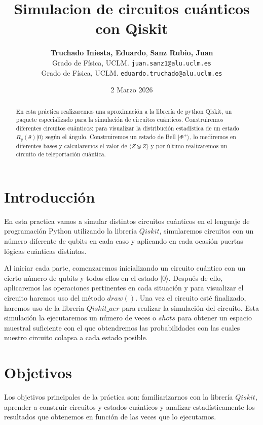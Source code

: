 \documentclass[11pt, a4paper, twocolumn]{article}
\title{\textbf{\Large Simulacion de circuitos cuánticos con Qiskit}}
\author{
	\textbf{Truchado Iniesta, Eduardo}, \textbf{Sanz Rubio, Juan} \\
	\small Grado de Física, UCLM. \texttt{juan.sanz1@alu.uclm.es} \\
	\small Grado de Física, UCLM. \texttt{eduardo.truchado@alu.uclm.es}
}
\date{\small 2 Marzo 2026}
\begin{document}
\maketitle
\thispagestyle{fancy}


\begin{abstract}
En esta práctica realizaremos una aproximación a la librería de python Qiskit,
un paquete especializado para la simulación de circuitos cuánticos. Construiremos
diferentes circuitos cuánticos: para visualizar la distribución estadística de 
un estado $R_y(\theta)|0\rangle$ según el ángulo. Construiremos un estado de Bell
$|\Phi^+\rangle$, lo mediremos en diferentes bases y calcularemos el valor de 
$\langle Z \otimes Z \rangle$ y por último realizaremos un circuito de teleportación 
cuántica.

\end{abstract}


\section{Introducción}

En esta practica vamos a simular distintos circuitos cuánticos en el 
lenguaje de programación Python utilizando la librería $Qiskit$, simularemos
circuitos con un número diferente de qubits en cada caso y aplicando en cada ocasión
puertas lógicas cuánticas distintas.

\vspace{0.2cm}

Al iniciar cada parte, comenzaremos inicializando un circuito cuántico
con un cierto número de qubits y todos ellos en el estado $|0\rangle$.
Después de ello, aplicaremos las operaciones pertinentes en cada situación
y para visualizar el circuito haremos uso del método $draw()$. Una vez
el circuito esté finalizado, haremos uso de la libreria $Qiskit\_aer$ para
realizar la simulación del circuito. Esta simulación la ejecutaremos un
número de veces o $shots$ para obtener un espacio muestral suficiente con
el que obtendremos las probabilidades con las cuales nuestro circuito colapsa
a cada estado posible.

\section{Objetivos}
Los objetivos principales de la práctica son: familiarizarnos con la librería $Qiskit$,
aprender a construir circuitos y estados cuánticos y analizar estadísticamente 
los resultados que obtenemos en función de las veces que lo ejecutamos.
\end{document}
